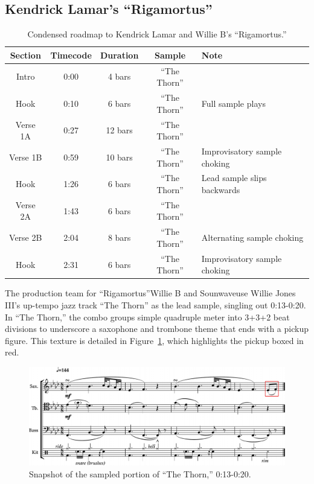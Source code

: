 \subsection*{\centering Kendrick Lamar's ``Rigamortus''}

    \begin{table}[ht]
        \centering
            \begin{tabular}{|c|c|c|c|l|}
                \hline
                Section  & Timecode & Duration & Sample        & Note \\ \hline
                Intro    & 0:00     & 4 bars   & ``The Thorn'' & \\ \hline
                Hook     & 0:10     & 6 bars   & ``The Thorn'' & Full sample plays \\ \hline
                Verse 1A & 0:27     & 12 bars  & ``The Thorn'' & \\ \hline
                Verse 1B & 0:59     & 10 bars  & ``The Thorn'' & Improvisatory sample choking \\ \hline
                Hook     & 1:26     & 6 bars   & ``The Thorn'' & Lead sample slips backwards \\ \hline
                Verse 2A & 1:43     & 6 bars   & ``The Thorn'' & \\ \hline
                Verse 2B & 2:04     & 8 bars   & ``The Thorn'' & Alternating sample choking \\ \hline
                Hook     & 2:31     & 6 bars   & ``The Thorn'' & Improvisatory sample choking\\ \hline
            \end{tabular}
        \caption{Condensed roadmap to Kendrick Lamar and Willie B's ``Rigamortus.''}
        \label{tab:rigamortus}
    \end{table}

The production team for ``Rigamortus''\textemdash Willie B and Sounwave\textemdash use Willie Jones III's up-tempo jazz track ``The Thorn'' as the lead sample,  singling out 0:13-0:20. In ``The Thorn,'' the combo groups simple quadruple meter into 3+3+2 beat divisions to underscore a saxophone and trombone theme that ends with a pickup figure. This texture is detailed in Figure~\ref{fig:thethornfull}, which highlights the pickup boxed in red.

    \begin{figure}[ht]
        \centering
        \includegraphics[width=\textwidth]{images/figures/chp 02/013020thethornfull.pdf}
        \caption{Snapshot of the sampled portion of ``The Thorn,'' 0:13-0:20.}
        \label{fig:thethornfull}
    \end{figure}

